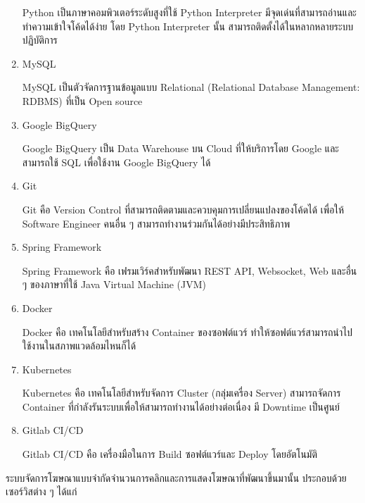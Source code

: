 \begin{enumerate}
	Python เป็นภาษาคอมพิวเตอร์ระดับสูงที่ใช้ Python Interpreter มีจุดเด่นที่สามารถอ่านและทำความเข้าใจโค้ดได้ง่าย โดย Python Interpreter นั้น สามารถติดตั้งได้ในหลากหลายระบบปฏิบัติการ  ~\cite{python}
	
	\item MySQL
	
	MySQL เป็นตัวจัดการฐานข้อมูลแบบ Relational (Relational Database Management: RDBMS) ที่เป็น Open source ~\cite{mysql}
	
	\item Google BigQuery
	
	Google BigQuery เป็น Data Warehouse บน Cloud ที่ให้บริการโดย Google และสามารถใช้ SQL เพื่อใช้งาน Google BigQuery ได้ ~\cite{bigquery}
	
	\item Git
	
	Git คือ Version Control ที่สามารถติดตามและควบคุมการเปลี่ยนแปลงของโค้ดได้ เพื่อให้ Software Engineer คนอื่น ๆ สามารถทำงานร่วมกันได้อย่างมีประสิทธิภาพ ~\cite{git}
	
	\item Spring Framework
	
	Spring Framework คือ เฟรมเวิร์คสำหรับพัฒนา REST API, Websocket, Web และอื่น ๆ ของภาษาที่ใช้ Java Virtual Machine (JVM) ~\cite{spring}
	
	\item Docker
	
	Docker คือ เทคโนโลยีสำหรับสร้าง Container ของซอฟต์แวร์ ทำให้ซอฟต์แวร์สามารถนำไปใช้งานในสภาพแวดล้อมไหนก็ได้ ~\cite{docker}
	
	\item Kubernetes

	Kubernetes คือ เทคโนโลยีสำหรับจัดการ Cluster (กลุ่มเครื่อง Server) สามารถจัดการ Container ที่กำลังรันระบบเพื่อให้สามารถทำงานได้อย่างต่อเนื่อง มี Downtime เป็นศูนย์ ~\cite{kubernetes}
	
	\item Gitlab CI/CD
	
	Gitlab CI/CD คือ เครื่องมือในการ Build ซอฟต์แวร์และ Deploy โดยอัตโนมัติ ~\cite{gitlabcicd}
	
\end{enumerate}

ระบบจัดการโฆษณาแบบจำกัดจำนวนการคลิกและการแสดงโฆษณาที่พัฒนาขึ้นมานั้น ประกอบด้วยเซอร์วิสต่าง ๆ ได้แก่

